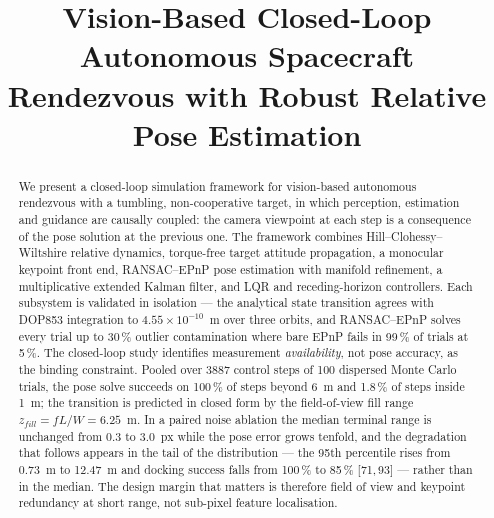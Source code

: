 \documentclass[conference]{IEEEtran}
\begin{document}
\title{
Vision-Based Closed-Loop Autonomous Spacecraft
Rendezvous with Robust Relative Pose Estimation
}

\author{
}

\maketitle


\begin{abstract}
We present a closed-loop simulation framework for vision-based autonomous
rendezvous with a tumbling, non-cooperative target, in which perception,
estimation and guidance are causally coupled: the camera viewpoint at each
step is a consequence of the pose solution at the previous one. The framework
combines Hill--Clohessy--Wiltshire relative dynamics, torque-free target
attitude propagation, a monocular keypoint front end, RANSAC--EPnP pose
estimation with manifold refinement, a multiplicative extended Kalman filter,
and LQR and receding-horizon controllers. Each subsystem is validated in
isolation --- the analytical state transition agrees with DOP853 integration
to $4.55\times10^{-10}$~m over three orbits, and RANSAC--EPnP solves every
trial up to 30\,\% outlier contamination where bare EPnP fails in 99\,\% of
trials at 5\,\%.
The closed-loop study identifies measurement \emph{availability}, not pose
accuracy, as the binding constraint. Pooled over 3887 control steps of 100
dispersed Monte Carlo trials, the pose solve succeeds on 100\,\% of steps
beyond 6~m and 1.8\,\% of steps inside 1~m; the transition is predicted in
closed form by the field-of-view fill range $z_{fill} = fL/W = 6.25$~m. In a
paired noise ablation the median terminal range is unchanged from 0.3 to
3.0~px while the pose error grows tenfold, and the degradation that follows
appears in the tail of the distribution --- the 95th percentile rises from
0.73~m to 12.47~m and docking success falls from 100\,\% to
85\,\% [71,\,93] --- rather than in the median. The design margin that matters
is therefore field of view and keypoint redundancy at short range, not
sub-pixel feature localisation.
\end{abstract}
\end{document}

